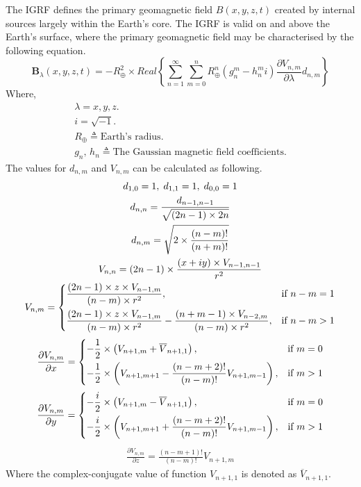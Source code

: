 The IGRF defines the primary geomagnetic field $B(x,y,z,t)$ created by internal sources largely within the Earth's core. The IGRF is valid on and above the Earth's surface, where the primary geomagnetic field may be characterised by the following equation.
\begin{equation}
    \label{eqn:IGRF1}
    \mathbf{B}_{\lambda}(x, y, z, t) = - R_{\oplus}^2 \times Real \left\{\sum_{n=1}^{\infty} \sum_{m=0}^{n} R_{\oplus}^n (g_n^m -  h_n^m i) \frac{\partial V_{n,m}}{\partial \lambda}  d_{n,m} \right\}
\end{equation}
Where,
\begin{gather*} 
\lambda = x, y, z.\\
i =\sqrt{-1}.\\
R_{\oplus}\triangleq \text{Earth’s radius}.\\
g_n, \, h_n \triangleq \text{The Gaussian magnetic field coefficients}.
\end{gather*}
The values for $d_{n,m}$ and $V_{n,m}$ can be calculated as following.
\begin{gather} 
d_{1,0} = 1, \; d_{1,1} = 1, \; d_{0,0} = 1 \\
d_{n,n} = \frac{d_{n-1,n-1}}{\sqrt{(2n-1)\times2n}}\\
d_{n,m} = \sqrt{2 \times \frac{(n-m)!}{(n+m)!}}\\
V_{n,n} = (2n - 1) \times \frac{(x+iy)\times V_{n-1,n-1}}{r^2}\\
V_{n,m} = \begin{dcases}
 \frac{(2n-1)\times z \times V_{n-1,m}}{(n-m)\times r^2}, &\mbox{if } n-m = 1 \\
 \frac{(2n-1) \times z \times V_{n-1,m}}{(n-m)\times r^2} - \frac{(n+m-1)\times  V_{n-2,m}}{(n-m) \times r^2}, &\mbox{if } n-m > 1
\end{dcases}
\end{gather}
\begin{gather}
    \frac{\partial V_{n,m}}{\partial x} = \begin{dcases}
    - \frac{1}{2} \times \left(V_{n+1,m} + \overline{V}_{n+1,1} \right) , &\mbox{if } m = 0 \\
    -\frac{1}{2} \times \left(V_{n+1,m+1} - \frac{(n-m+2)!}{(n-m)!} V_{n+1,m-1} \right), &\mbox{if } m > 1
\end{dcases}
\end{gather}
\begin{gather}
   \frac{\partial V_{n,m}}{\partial y} = \begin{dcases}
    - \frac{i}{2} \times \left(V_{n+1,m} - \overline{V}_{n+1,1} \right) , &\mbox{if } m = 0 \\
    -\frac{i}{2} \times \left(V_{n+1,m+1} + \frac{(n-m+2)!}{(n-m)!} V_{n+1,m-1} \right), &\mbox{if } m > 1
\end{dcases}
\end{gather}
\begin{gather}
    \frac{\partial V_{n,m}}{\partial z} = \frac{(n-m+1)!}{(n-m)!} V_{n+1,m}
\end{gather}
Where the complex-conjugate value of function $V_{n+1,1}$ is denoted as $\overline{V}_{n+1,1}$.

